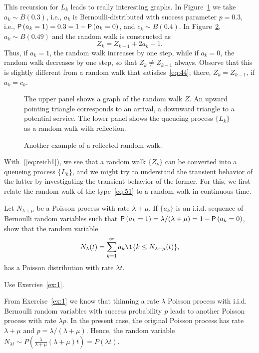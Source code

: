 This recursion for $L_k$ leads to really interesting graphs. In Figure~\ref{fig:random_bernoulli}
 we take $a_k \sim B(0.3)$, i.e., $a_k$ is Bernoulli-distributed with success
parameter $p=0.3$, i.e., $\P{a_k = 1} = 0.3 = 1- \P{a_k=0}$, and
$c_k \sim B(0.4)$. In Figure~\ref{fig:random_walk},  $a_k\sim B(0.49)$ and
the random walk is constructed as
\begin{equation}\label{eq:51}
  Z_k = Z_{k-1} + 2 a_k -1.
\end{equation}
Thus, if $a_k=1$, the random walk increases by one step, while if $a_k=0$, the random walk decreases by one step, so that $Z_k \neq Z_{k-1}$  always. Observe that this is slightly different from a random walk that satisfies~\eqref{eq:44}; there, $Z_{k}=Z_{k-1}$, if $a_k=c_k$.


\begin{figure}[ht]
  \centering

%
\caption{The upper panel shows a graph of the random walk $Z$. An
  upward pointing triangle corresponds to an arrival, a downward
  triangle to a potential service. The lower panel shows the queueing
  process $\{L_k\}$ as a random walk with reflection.}
\label{fig:random_bernoulli}
\end{figure}

\begin{figure}[ht]
  \centering

\caption{Another example of a reflected random walk.}
\label{fig:random_walk}
\end{figure}


With~(\ref{eq:reich1}),  we see that a random walk $\{Z_k\}$ can be converted into a queueing
process $\{L_k\}$, and we might try to understand the transient behavior of the latter by investigating the transient behavior of the former.  For this, we first relate the random walk of the type~\eqref{eq:51} to a random walk in continuous time. 

\begin{exercise}[\faCalculator]
  Let $N_{\lambda+\mu}$ be a Poisson process with rate $\lambda+\mu$. If $\{a_k\}$ is an i.i.d. sequence of Bernoulli random variables such that $\P{a_k=1} = \lambda/(\lambda+\mu)=1-\P{a_k=0}$, show that the random variable
  \begin{equation*}
    N_\lambda(t) = \sum_{k=1}^\infty a_k \1{k \leq N_{\lambda+\mu}(t)},
  \end{equation*}
has a Poisson distribution with rate $\lambda t$. 
\begin{hint}
Use Exercise~\ref{ex:1}.
\end{hint}
\begin{solution}
  From Exercise~\ref{ex:1} we know that thinning  a rate $\lambda$ Poisson process  with i.i.d. Bernoulli random variables with success probability $p$  leads to another Poisson process with rate $\lambda p$. In the present case, the original Poisson process has rate $\lambda+\mu$ and $p=\lambda/(\lambda+\mu)$. Hence, the random variable $N_{\lambda t}\sim P\left(\frac\lambda{\lambda+\mu} (\lambda+\mu)t\right) = P(\lambda t)$.
\end{solution}
\end{exercise}

